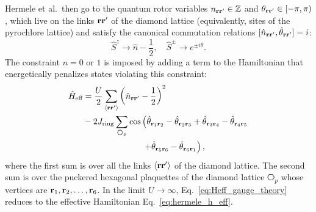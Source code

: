 \documentclass[twocolumn,superscriptaddress,amsmath,amssymb,aps,prx,nofootinbib]{revtex4-2}
\begin{document}
Hermele et al.~then go to the quantum rotor variables $n_{\vb{r}\vb{r}'} \in \mathbb{Z}$ and $\theta_{\vb{r}\vb{r}'} \in [-\pi,\pi)$, which live on the links $\vb{r}\vb{r}'$ of the diamond lattice (equivalently, sites of the pyrochlore lattice) and satisfy the canonical commutation relations $[\hat{n}_{\vb{r}\vb{r}'} ,\hat{\theta}_{\vb{r}\vb{r}'} ] = i$:
\begin{equation} \label{eq:rotor_mapping}
  \hat{S}^z \rightarrow \hat{n} - \frac{1}{2},  \quad  \hat{S}^\pm  \rightarrow e^{ \pm i\hat{\theta}}.
\end{equation}
The constraint $n = 0 \text{ or }1$ is imposed by adding a term to the Hamiltonian that energetically penalizes states violating this constraint: 
\begin{align} \label{eq:Heff_gauge_theory}
  \hat{H}_{\text{eff}} & =   \frac{U}{2} \sum_{\langle \vb{r}\vb{r}' \rangle} \left( \hat{n}_{\vb{r}\vb{r'}} -\frac{1}{2} \right)^2 \\ \nonumber
&  - 2 J_{\text{ring}} \sum_{\hexagon_p} \cos\left(\hat{\theta}_{\vb{r}_1\vb{r}_2} -\hat{\theta}_{\vb{r}_2 \vb{r}_3}+\hat{\theta}_{\vb{r}_3\vb{r}_4}- \hat{\theta}_{\vb{r}_4\vb{r}_5}\right.\\
& \quad \quad \quad \quad \quad \quad \quad \left.+\hat{\theta}_{\vb{r}_5\vb{r}_6}-\hat{\theta}_{\vb{r}_6\vb{r}_1}\right),
\end{align}
where the first sum is over all the links $\langle\vb{r}\vb{r}'\rangle$ of the diamond lattice. The second sum is over the puckered hexagonal plaquettes of the diamond lattice $\hexagon_p$  whose vertices are $\vb{r}_1, \vb{r}_2, \ldots ,\vb{r}_6$.
In the limit $U \rightarrow \infty$, Eq.~\eqref{eq:Heff_gauge_theory} reduces to the effective Hamiltonian Eq.~\eqref{eq:hermele_h_eff}.
\end{document}
